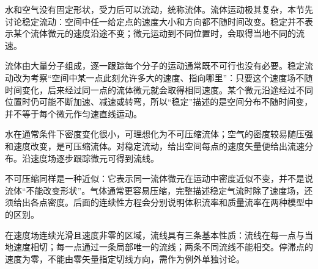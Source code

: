 {\newcommand{\FallingJetDiagram}{%
\begin{center}\begin{minipage}{\linewidth}\centering\begin{tikzpicture}[scale=.85,>=Latex]
 \draw[thick] (-1.8,1)--(-1.8,0)--(-.50,0) (.50,0)--(1.8,0)--(1.8,1);
 \foreach \sgn in {-1,1}{\draw[DeepBlue,thick,domain=0:3.7,samples=90,variable=\s]
  plot ({\sgn*.5/(1+1.2*\s)^.25},{-\s});}
 \draw[TextGray,dashed] (-.75,0)--(1.3,0) (-.75,-3)--(1.3,-3);
 \draw[<->,TextGray] (-1.1,0)--(-1.1,-3) node[midway,left]{$h$};
 \draw[DeepBlue,dashed] (-.5,0)--(.5,0);
 \draw[DeepBlue,thick] ({-.5/4.6^.25},-3)--({.5/4.6^.25},-3);
 \node[above] at (0,.12) {$S$};\node[left] at (-.55,-3.25) {$S(h)$};
 \draw[->,DeepBlue,thick] (1.3,0)--(1.3,-.65) node[right]{$v$};
 \draw[->,DeepBlue,thick] (1.3,-3)--(1.3,-4.1) node[right]{$v(h)$};
\end{tikzpicture}\figcap{高度差 $h$ 的末端就是截面 $S(h)$；两速度箭头分别从对应截面起画。}\label{ch13:fig:k10-ex-2-99}\end{minipage}\end{center}}


\label{ch13:sec:flow-intro}

水和空气没有固定形状，受力后可以流动，统称流体。流体运动极其复杂，本节先讨论稳定流动：空间中任一给定点的速度大小和方向都不随时间改变。稳定并不表示某个流体微元的速度沿途不变；微元运动到不同位置时，会取得当地不同的流速。

流体由大量分子组成，逐一跟踪每个分子的运动通常既不可行也没有必要。稳定流动改为考察“空间中某一点此刻允许多大的速度、指向哪里”：只要这个速度场不随时间变化，后来经过同一点的流体微元就会取得相同速度。某个微元沿途经过不同位置时仍可能不断加速、减速或转弯，所以“稳定”描述的是空间分布不随时间变，并不等于每个微元作匀速直线运动。

水在通常条件下密度变化很小，可理想化为不可压缩流体；空气的密度较易随压强和速度改变，是可压缩流体。对稳定流动，给出空间每点的速度矢量便给出流速分布。沿速度场逐步跟踪微元可得到流线。

不可压缩同样是一种近似：它表示同一流体微元在运动中密度近似不变，并不是说流体“不能改变形状”。气体通常更容易压缩，完整描述稳定气流时除了速度场，还须给出各点密度。后面的连续性方程会分别说明体积流率和质量流率在两种模型中的区别。

\SphereStreamlinesDiagram

在速度场连续光滑且速度非零的区域，流线具有三条基本性质：流线在每一点与当地速度相切；每一点通过一条局部唯一的流线；两条不同流线不能相交。停滞点的速度为零，不能由零矢量指定切线方向，需作为例外单独讨论。

}
